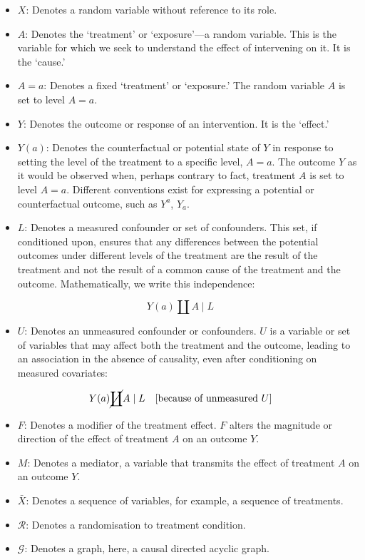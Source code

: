 \documentclass[
  single column]{article}
\providecommand{\tightlist}{%
  \setlength{\itemsep}{0pt}\setlength{\parskip}{0pt}}\usepackage{longtable,booktabs,array}
\begin{document}
\begin{itemize}
\item
  \textbf{\(X\)}: Denotes a random variable without reference to its
  role.
\item
  \textbf{\(A\)}: Denotes the `treatment' or `exposure'---a random
  variable. This is the variable for which we seek to understand the
  effect of intervening on it. It is the `cause.'
\item
  \textbf{\(A=a\)}: Denotes a fixed `treatment' or `exposure.' The
  random variable \(A\) is set to level \(A=a\).
\item
  \textbf{\(Y\)}: Denotes the outcome or response of an intervention. It
  is the `effect.'
\item
  \textbf{\(Y(a)\)}: Denotes the counterfactual or potential state of
  \(Y\) in response to setting the level of the treatment to a specific
  level, \(A=a\). The outcome \(Y\) as it would be observed when,
  perhaps contrary to fact, treatment \(A\) is set to level \(A=a\).
  Different conventions exist for expressing a potential or
  counterfactual outcome, such as \(Y^a\), \(Y_a\).
\item
  \textbf{\(L\)}: Denotes a measured confounder or set of confounders.
  This set, if conditioned upon, ensures that any differences between
  the potential outcomes under different levels of the treatment are the
  result of the treatment and not the result of a common cause of the
  treatment and the outcome. Mathematically, we write this independence:
\end{itemize}

\[
Y(a) \coprod A \mid L
\]

\begin{itemize}
\tightlist
\item
  \textbf{\(U\)}: Denotes an unmeasured confounder or confounders. \(U\)
  is a variable or set of variables that may affect both the treatment
  and the outcome, leading to an association in the absence of
  causality, even after conditioning on measured covariates:
\end{itemize}

\[
Y(a) \cancel{\coprod} A \mid L \quad \text{[because of unmeasured } U]
\]

\begin{itemize}
\item
  \textbf{\(F\)}: Denotes a modifier of the treatment effect. \(F\)
  alters the magnitude or direction of the effect of treatment \(A\) on
  an outcome \(Y\).
\item
  \textbf{\(M\)}: Denotes a mediator, a variable that transmits the
  effect of treatment \(A\) on an outcome \(Y\).
\item
  \textbf{\(\bar{X}\)}: Denotes a sequence of variables, for example, a
  sequence of treatments.
\item
  \textbf{\(\mathcal{R}\)}: Denotes a randomisation to treatment
  condition.
\item
  \textbf{\(\mathcal{G}\)}: Denotes a graph, here, a causal directed
  acyclic graph.
\end{itemize}
\end{document}
